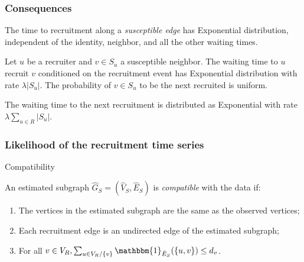 \documentclass{beamer}
\begin{document}
\begin{frame}
  
  \frametitle{Consequences}
  
  \justifying
  The time to recruitment along a {\em susceptible edge} has Exponential
  distribution, independent of the identity, neighbor, and all the other
  waiting times.

  \begin{theorem}
    \justifying

    Let $u$ be a recruiter and $v \in S_u$ a susceptible neighbor. The waiting
    time to $u$ recruit $v$ conditioned on the recruitment event has
    Exponential distribution with rate $\lambda |S_u|$. The probability of $v
    \in S_u$ to be the next recruited is uniform.  
  \end{theorem}

  \begin{theorem}
    \justifying

    The waiting time to the next recruitment is distributed as Exponential
    with rate $\lambda \sum_{u \in R} |S_u|$.  
  \end{theorem}

\end{frame}

\begin{frame}
  
  \frametitle{Likelihood of the recruitment time series}

  \begin{block}{Compatibility}
    \justifying

  An estimated subgraph $\hat{G}_S = (\hat{V}_S, \hat{E}_S)$ is {\em
  compatible} with the data if:
  \begin{enumerate}
    \item The vertices in the estimated subgraph are the same as the observed vertices;
    
    \item Each recruitment edge is an undirected edge of the estimated subgraph;
    
    \item For all $v \in V_R, \sum_{u \in V_R / \{v\}} \mathbbm{1}_{\hat{E}_S}(\{u,v\}) \le d_v $.
  \end{enumerate} 
    
  \end{block}

\end{frame}
\end{document}
